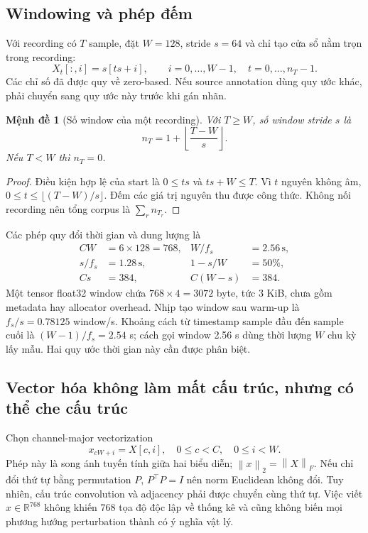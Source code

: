 \documentclass[11pt,a4paper]{article}
\newcommand{\R}{\mathbb R}
\newcommand{\norm}[1]{\left\lVert #1\right\rVert}
\newtheorem{proposition}[definition]{Mệnh đề}
\theoremstyle{remark}
\begin{document}
\subsection{Windowing và phép đếm}
Với recording có $T$ sample, đặt $W=128$, stride $s=64$ và chỉ tạo cửa sổ
nằm trọn trong recording:
\begin{equation}
 X_t[:,i]=s[ts+i],\qquad i=0,\ldots,W-1,
 \quad t=0,\ldots,n_T-1.
 \label{eq:window}
\end{equation}
Các chỉ số đã được quy về zero-based. Nếu source annotation dùng quy ước
khác, phải chuyển sang quy ước này trước khi gán nhãn.

\begin{proposition}[Số window của một recording]\label{prop:count}
Với $T\ge W$, số window stride $s$ là
\begin{equation}
 n_T=1+\left\lfloor\frac{T-W}{s}\right\rfloor.
\end{equation}
Nếu $T<W$ thì $n_T=0$.
\end{proposition}
\begin{proof}
Điều kiện hợp lệ của start là $0\le ts$ và $ts+W\le T$. Vì $t$ nguyên không
âm, $0\le t\le\lfloor(T-W)/s\rfloor$. Đếm các giá trị nguyên thu được công
thức. Không nối recording nên tổng corpus là $\sum_r n_{T_r}$.
\end{proof}
Các phép quy đổi thời gian và dung lượng là
\begin{align}
 CW&=6\times128=768, & W/f_s&=2.56\,\mathrm{s},\\
 s/f_s&=1.28\,\mathrm{s}, & 1-s/W&=50\%,\\
 Cs&=384, & C(W-s)&=384.
\end{align}
Một tensor float32 window chứa $768\times4=3072$ byte, tức $3$ KiB, chưa
gồm metadata hay allocator overhead. Nhịp tạo window sau warm-up là
$f_s/s=0.78125$ window/s. Khoảng cách từ timestamp sample đầu đến sample
cuối là $(W-1)/f_s=2.54$ s; cách gọi window 2.56 s dùng thời lượng $W$ chu
kỳ lấy mẫu. Hai quy ước thời gian này cần được phân biệt.

\subsection{Vector hóa không làm mất cấu trúc, nhưng có thể che cấu trúc}
Chọn channel-major vectorization
\begin{equation}
 x_{cW+i}=X[c,i],\quad 0\le c<C,\quad0\le i<W.
\end{equation}
Phép này là song ánh tuyến tính giữa hai biểu diễn; $\norm{x}_2=\norm{X}_F$.
Nếu chỉ đổi thứ tự bằng permutation $P$, $P^\top P=I$ nên norm Euclidean
không đổi. Tuy nhiên, cấu trúc convolution và adjacency phải được chuyển
cùng thứ tự. Việc viết $x\in\R^{768}$ không khiến 768 tọa độ độc lập về
thống kê và cũng không biến mọi phương hướng perturbation thành có ý nghĩa
vật lý.
\end{document}
